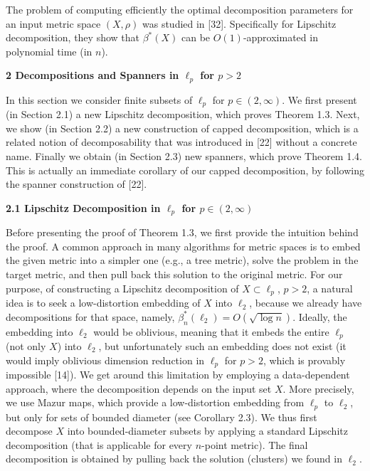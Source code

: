 \par
\par
The problem of computing efficiently the optimal decomposition parameters for an input metric space $(X,\rho)$ was studied in [32]. Specifically for Lipschitz decomposition, they show that $\beta^{*}(X)$ can be $O(1)$-approximated in polynomial time (in $n$).
\par
\par
\par
\par\medskip\noindent\textbf{2 Decompositions and Spanners in $\ell_{p}$ for $p>2$}\par
In this section we consider finite subsets of $\ell_{p}$ for $p\in(2,\infty)$. We first present (in Section 2.1) a new Lipschitz decomposition, which proves Theorem 1.3. Next, we show (in Section 2.2) a new construction of capped decomposition, which is a related notion of decomposability that was introduced in [22] without a concrete name. Finally we obtain (in Section 2.3) new spanners, which prove Theorem 1.4. This is actually an immediate corollary of our capped decomposition, by following the spanner construction of [22].
\par
\par
\par\medskip\noindent\textbf{2.1 Lipschitz Decomposition in $\ell_{p}$ for $p\in(2,\infty)$}\par
Before presenting the proof of Theorem 1.3, we first provide the intuition behind the proof. A common approach in many algorithms for metric spaces is to embed the given metric into a simpler one (e.g., a tree metric), solve the problem in the target metric, and then pull back this solution to the original metric. For our purpose, of constructing a Lipschitz decomposition of $X\subset\ell_{p}$, $p>2$, a natural idea is to seek a low-distortion embedding of $X$ into $\ell_{2}$, because we already have decompositions for that space, namely, $\beta^{*}_{n}(\ell_{2})=O(\sqrt{\log{n}})$. Ideally, the embedding into $\ell_{2}$ would be oblivious, meaning that it embeds the entire $\ell_{p}$ (not only $X$) into $\ell_{2}$, but unfortunately such an embedding does not exist (it would imply oblivious dimension reduction in $\ell_{p}$ for $p>2$, which is provably impossible [14]). We get around this limitation by employing a data-dependent approach, where the decomposition depends on the input set $X$. More precisely, we use Mazur maps, which provide a low-distortion embedding from $\ell_{p}$ to $\ell_{2}$, but only for sets of bounded diameter (see Corollary 2.3). We thus first decompose $X$ into bounded-diameter subsets by applying a standard Lipschitz decomposition (that is applicable for every $n$-point metric). The final decomposition is obtained by pulling back the solution (clusters) we found in $\ell_{2}$.
